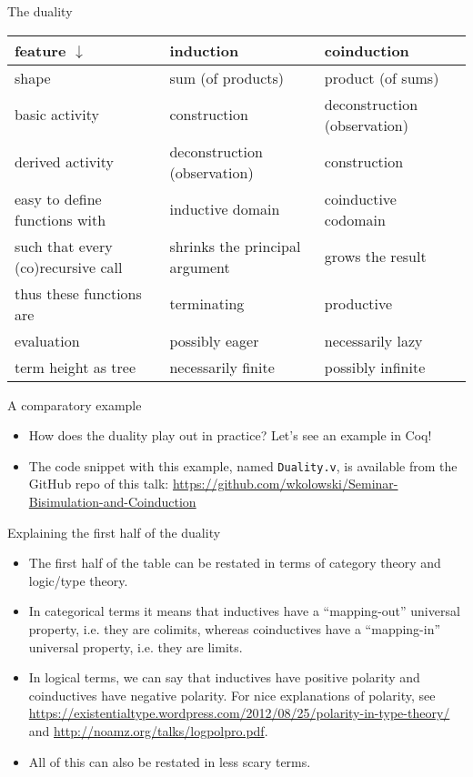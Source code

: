 \documentclass{beamer}
\begin{document}
\begin{frame}{The duality}
\begin{tabular}{ | p{3cm} | p{3cm} | p{3cm} | }
	\hline
	feature $\downarrow$ & induction & coinduction \\\hline
	shape & sum (of products) & product (of sums) \\\hline
	basic activity & construction & deconstruction (observation) \\\hline
	derived activity & deconstruction (observation) & construction \\\hline
	easy to define functions with & inductive domain & coinductive codomain \\\hline
	such that every (co)recursive call & shrinks the principal argument & grows the result \\\hline
	thus these functions are & terminating & productive \\\hline
	evaluation & possibly eager & necessarily lazy \\\hline
	term height as tree & necessarily finite & possibly infinite \\\hline
\end{tabular}
\end{frame}

\begin{frame}{A comparatory example}
\begin{itemize}
	\item How does the duality play out in practice? Let's see an example in Coq!
	\item The code snippet with this example, named \texttt{Duality.v}, is available from the GitHub repo of this talk: \url{https://github.com/wkolowski/Seminar-Bisimulation-and-Coinduction}
\end{itemize}
\end{frame}

\begin{frame}{Explaining the first half of the duality}
\begin{itemize}
	\item The first half of the table can be restated in terms of category theory and logic/type theory.
	\item In categorical terms it means that inductives have a ``mapping-out'' universal property, i.e. they are colimits, whereas coinductives have a ``mapping-in'' universal property, i.e. they are limits.
	\item In logical terms, we can say that inductives have positive polarity and coinductives have negative polarity. For nice explanations of polarity, see \url{https://existentialtype.wordpress.com/2012/08/25/polarity-in-type-theory/} and \url{http://noamz.org/talks/logpolpro.pdf}.
	\item All of this can also be restated in less scary terms.
\end{itemize}
\end{frame}
\end{document}
